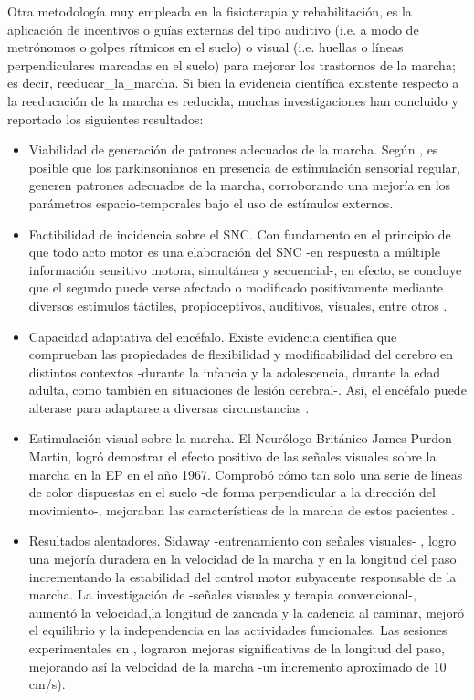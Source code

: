 Otra metodología muy empleada en la fisioterapia y rehabilitación, es la aplicación de incentivos o guías externas del tipo auditivo (i.e. a modo de metrónomos o golpes rítmicos en el suelo) o visual (i.e. huellas o líneas perpendiculares marcadas en el suelo) para mejorar los trastornos de la marcha; es decir, \gls{reeducar_la_marcha}. Si bien la evidencia científica existente respecto a la reeducación de la marcha es reducida, muchas investigaciones han concluido y reportado los siguientes resultados:

\begin{itemize}
    \item Viabilidad de generación de patrones adecuados de la marcha. Según \cite{MorrisME1994,Morris1996}, es posible que los parkinsonianos en presencia de estimulación sensorial regular, generen patrones adecuados de la marcha, corroborando una mejoría en los parámetros espacio-temporales bajo el uso de estímulos externos.
    
    \item Factibilidad de incidencia sobre el \gls{SNC}. Con fundamento en el principio de que todo acto motor es una elaboración del SNC -en respuesta a múltiple información sensitivo motora, simultánea y secuencial-, en efecto, se concluye que el segundo puede verse afectado o modificado positivamente mediante diversos estímulos táctiles, propioceptivos, auditivos, visuales, entre otros \cite{Moros2000}.
    
    \item Capacidad adaptativa del encéfalo. Existe evidencia científica que comprueban las propiedades de flexibilidad y modificabilidad del cerebro en distintos contextos -durante la infancia y la adolescencia, durante la edad adulta, como también en situaciones de lesión cerebral-. Así, el encéfalo puede alterase para adaptarse a diversas circunstancias \cite{Garces2014}.
    \item Estimulación visual sobre la marcha. El Neurólogo Británico James Purdon Martin,  logró demostrar el efecto positivo de las señales visuales sobre la marcha en la EP en el año 1967. Comprobó cómo tan solo una serie de líneas de color dispuestas en el suelo -de forma perpendicular a la dirección del movimiento-, mejoraban las características de la marcha de estos pacientes  \cite{Ostrosky2000,PALACIOSNAVARRO201649,Mille2012, ilianaloyola2017}.
    \item Resultados alentadores. Sidaway -entrenamiento con señales visuales- \cite{Moros2000}, logro una mejoría duradera en la velocidad de la marcha y en la longitud del paso incrementando la estabilidad del control motor subyacente responsable de la marcha. La investigación de \cite{Dias2017TREINODM} -señales visuales y terapia convencional-, aumentó la velocidad,la longitud de zancada y la cadencia al caminar, mejoró el equilibrio y la independencia en las actividades funcionales. Las sesiones experimentales en \cite{Almeida2012}, lograron mejoras  significativas de la longitud del paso, mejorando así la velocidad de la marcha -un incremento aproximado de 10 cm/s).
\end{itemize}

